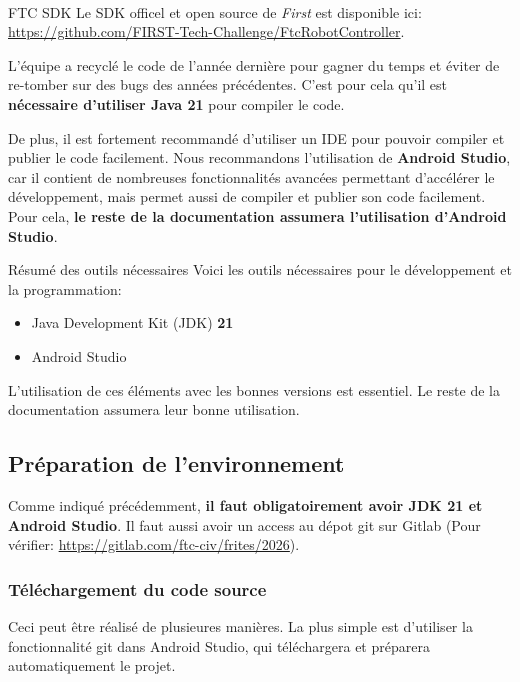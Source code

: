 \documentclass[12pt, a4paper]{report}
\newcommand{\registeredcompany}[1]{\textit{#1\textsuperscript{\tiny\textregistered}}}
\begin{document}
    \begin{mydefinition}{FTC SDK}
        Le SDK officel et open source de \registeredcompany{First} est disponible ici: \url{https://github.com/FIRST-Tech-Challenge/FtcRobotController}.
    \end{mydefinition}

    L'équipe a recyclé le code de l'année dernière pour gagner du temps et éviter de re-tomber sur des bugs des années précédentes. C'est pour cela qu'il est \textbf{nécessaire d'utiliser Java 21} pour compiler le code.

    De plus, il est fortement recommandé d'utiliser un IDE pour pouvoir compiler et publier le code facilement. Nous recommandons l'utilisation de \textbf{Android Studio}, car il contient de nombreuses fonctionnalités avancées permettant d’accélérer le développement, mais permet aussi de compiler et publier son code facilement. Pour cela, \textbf{le reste de la documentation assumera l'utilisation d'Android Studio}.

    \begin{myinfo}{Résumé des outils nécessaires}
        Voici les outils nécessaires pour le développement et la programmation:
        \begin{itemize}
            \item Java Development Kit (JDK) \textbf{21}
            \item Android Studio
        \end{itemize}
        L'utilisation de ces éléments avec les bonnes versions est essentiel. Le reste de la documentation assumera leur bonne utilisation.
    \end{myinfo}

    \subsection{Préparation de l'environnement}

    Comme indiqué précédemment, \textbf{il faut obligatoirement avoir JDK 21 et Android Studio}. Il faut aussi avoir un access au dépot git sur Gitlab (Pour vérifier: \url{https://gitlab.com/ftc-civ/frites/2026}).

    \subsubsection{Téléchargement du code source}

    Ceci peut être réalisé de plusieures manières. La plus simple est d'utiliser la fonctionnalité git dans Android Studio, qui téléchargera et préparera automatiquement le projet.
\end{document}
